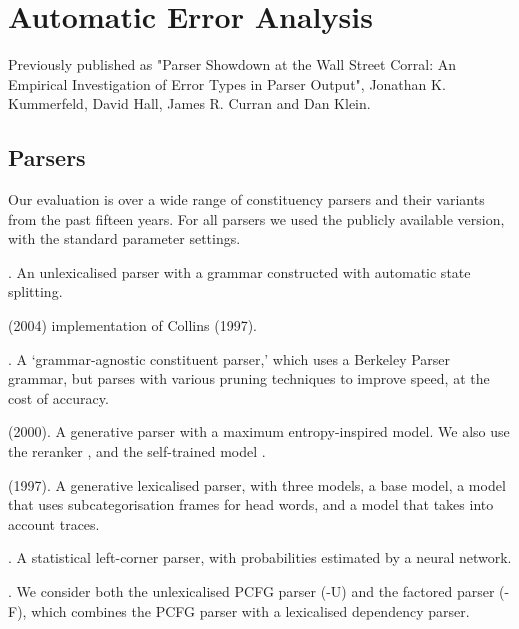 \chapter{Automatic Error Analysis}


Previously published as "Parser Showdown at the Wall Street Corral: An Empirical Investigation of Error Types in Parser Output", Jonathan K. Kummerfeld, David Hall, James R. Curran and Dan Klein.

\section{Parsers}

Our evaluation is over a wide range of \ptb constituency parsers and their variants from the past fifteen years.
For all parsers we used the publicly available version, with the standard parameter settings.

\begin{description}\itemsep1pt
	\item[ Berkeley] \parencite{Petrov-etal:2006,Petrov-Klein:2007}. An
	unlexicalised parser with a grammar constructed with automatic state
	splitting.

	\item[ Bikel] (2004)\nocite{Bikel:2004} implementation of Collins (1997).

	\item[ BUBS]
	\parencite{Dunlop-Bodenstab-Roark:2011,Bodenstab-Dunlop-Hall-Roark:2011}. A
	`grammar-agnostic constituent parser,' which uses a Berkeley Parser grammar,
	but parses with various pruning techniques to improve speed, at the cost of
	accuracy.

	\item[ Charniak] (2000)\nocite{Charniak:2000}. A generative parser with a
	maximum entropy-inspired model.  We also use the reranker
	\parencite{Charniak-Johnson:2005}, and the self-trained model
	\parencite{McClosky-Charniak-Johnson:2006}.

	\item[ Collins] (1997)\nocite{Collins:1997}. A generative lexicalised parser, with
	three models, a base model, a model that uses subcategorisation
	frames for head words, and a model that takes into account traces.

	\item[ SSN] \parencite{Henderson:2003,Henderson:2004}. A statistical left-corner
	parser, with probabilities estimated by a neural network.

	\item[ Stanford] \parencite{Klein-Manning:2003,Klein-Manning:2003:NIPS}. We
	consider both the unlexicalised PCFG parser (-U) and the factored parser
	(-F), which combines the PCFG parser with a lexicalised dependency parser.
\end{description}

